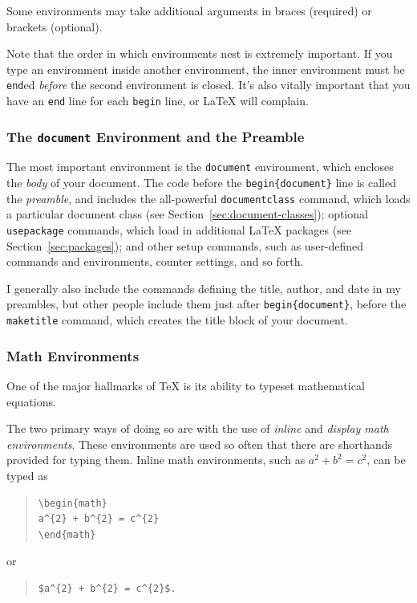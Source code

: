 \documentclass{icmmcm}
\newcommand{\bslash}{\symbol{'134}}%
\newcommand{\bsl}{{\texttt{\bslash}}}
\newcommand{\key}[1]{\textsf{\emph{#1}}\xspace}
\newcommand{\env}[1]{\texttt{#1}\xspace}
\newcommand{\command}[1]{\texttt{\bsl{}#1}\xspace}
\newcommand{\tex}{\TeX\xspace}
\newcommand{\latex}{\LaTeX\xspace}
\begin{document}
{Some environments may take additional arguments in braces (required)
or brackets (optional).

Note that the order in which environments nest is extremely important.
If you type an environment inside another environment, the inner
environment must be \command{end}{}ed \emph{before} the second
environment is closed.  It's also vitally important that you have an
\command{end} line for each \command{begin} line, or \latex will
complain.

\subsubsection{The \env{document} Environment and the Preamble}%
\label{sec:document-environment}

The most important environment is the \env{document} environment,
which encloses the \key{body} of your document.  The code before the
\command{begin}\verb+{document}+ line is called the \key{preamble},
and includes the all-powerful \command{documentclass} command, which
loads a particular document class (see
Section~\ref{sec:document-classes}); optional \command{usepackage}
commands, which load in additional \latex packages (see
Section~\ref{sec:packages}); and other setup commands, such as
user-defined commands and environments, counter settings, and so
forth.

I generally also include the commands defining the title, author, and
date in my preambles, but other people include them just after
\command{begin}\verb+{document}+, before the \command{maketitle}
command, which creates the title block of your document.

\subsubsection{Math Environments}%
\label{sec:math-environments}

One of the major hallmarks of \tex is its ability to typeset
mathematical equations.

The two primary ways of doing so are with the use of \key{inline} and
\key{display math environments}.  These environments are used so
often that there are shorthands provided for typing them.  Inline math
environments, such as $a^2 + b^2 = c^2$, can be typed as
\begin{quote}
\begin{verbatim}
\begin{math}
a^{2} + b^{2} = c^{2}
\end{math}
\end{verbatim}
\end{quote}
or
\begin{quote}
\begin{verbatim}
$a^{2} + b^{2} = c^{2}$.
\end{verbatim}


\end{quote}}
\end{document}
